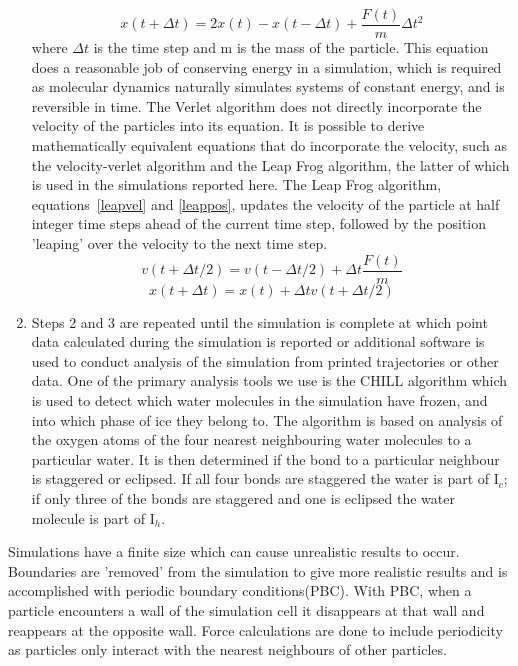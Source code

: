 \documentclass[titlepage]{article}
\begin{document}
\begin{enumerate}
\begin{equation}
x(t+\Delta t) = 2x(t)-x(t-\Delta t)+\frac{F(t)}{m}\Delta t^2
\label{verlet}
\end{equation}
where $\Delta t$ is the time step and m is the mass of the particle.  This equation does a reasonable job of conserving energy in a simulation, which is required as molecular dynamics naturally simulates systems of constant energy, and is reversible in time.  The Verlet algorithm does not directly incorporate the velocity of the particles into its equation.  It is possible to derive mathematically equivalent equations that do incorporate the velocity, such as the velocity-verlet algorithm and the Leap Frog algorithm, the latter of which is used in the simulations reported here.  The Leap Frog algorithm, equations~\ref{leapvel} and \ref{leappos}, updates the velocity of the particle at half integer time steps ahead of the current time step, followed by the position 'leaping' over the velocity to the next time step. 
\begin{equation}
v(t+\Delta t/2)=v(t-\Delta t/2)+\Delta t\frac{F(t)}{m}
\label{leapvel}
\end{equation}
\begin{equation}
x(t+\Delta t)=x(t)+\Delta tv(t+\Delta t/2)
\label{leappos}
\end{equation}
\item Steps 2 and 3 are repeated until the simulation is complete at which point data calculated during the simulation is reported or additional software is used to conduct analysis of the simulation from printed trajectories or other data.  One of the primary analysis tools we use is the CHILL algorithm\cite{MLWSM10} which is used to detect which water molecules in the simulation have frozen, and into which phase of ice they belong to.  The algorithm is based on analysis of the oxygen atoms of the four nearest neighbouring water molecules to a particular water.  It is then determined if the bond to a particular neighbour is staggered or eclipsed.  If all four bonds are staggered the water is part of I$_{c}$; if only three of the bonds are staggered and one is eclipsed the water molecule is part of I$_{h}$.\\
\end{enumerate}
\indent Simulations have a finite size which can cause unrealistic results to occur.  Boundaries are 'removed'  from the simulation to give more realistic results and is accomplished with periodic boundary conditions(PBC).  With PBC, when a particle encounters a wall of the simulation cell it disappears at that wall and reappears at the opposite wall.  Force calculations are done to include periodicity as particles only interact with the nearest neighbours of other particles.\\
\end{document}

